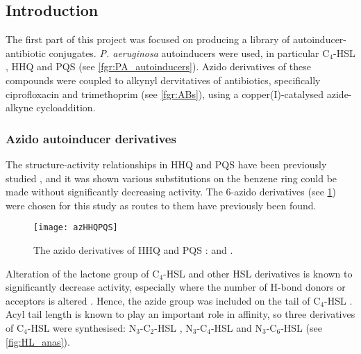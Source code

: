 \subsection{Introduction}

The first part of this project was focused on producing a library of autoinducer-antibiotic conjugates. \textit{P. aeruginosa} autoinducers were used, in particular C$_4$-HSL , HHQ  and PQS  (see \ref{fgr:PA_autoinducers}). Azido derivatives of these compounds were coupled to alkynyl dervitatives of antibiotics, specifically ciprofloxacin  and trimethoprim  (see \ref{fgr:ABs}), using a copper(I)-catalysed azide-alkyne cycloaddition\cite{Tornoe2002,ANIE:ANIE2596}.

\subsubsection{Azido autoinducer derivatives}

The structure-activity relationships in HHQ  and PQS  have been previously studied \cite{Lu2012,Lu2014,Hodgkinson2010}, and it was shown various substitutions on the benzene ring could be made without significantly decreasing activity. The 6-azido derivatives (see \ref{fgr:azHHQPQS}) were chosen for this study as routes to them have previously been found\cite{Baker2015}.


\begin{figure}[H]
	\begin{center}
		\texttt{[image: azHHQPQS]}
		\caption{The azido derivatives of HHQ  and PQS :  and . \label{fgr:azHHQPQS}}
	\end{center}
\end{figure}

Alteration of the lactone group of C$_4$-HSL  and other HSL derivatives is known to significantly decrease activity, especially where the number of H-bond donors or acceptors is altered \cite{Galloway2011}. Hence, the azide group was included on the tail of C$_4$-HSL  . Acyl tail length is known to play an important role in affinity, so three derivatives of C$_4$-HSL  were synthesised: N$_3$-C$_2$-HSL , N$_3$-C$_4$-HSL  and N$_3$-C$_6$-HSL  (see \ref{fig:HL_anas}).

